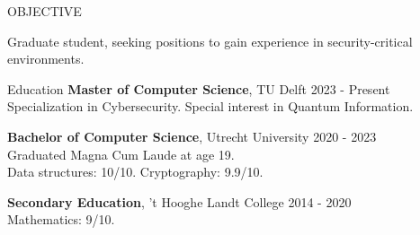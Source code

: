 \documentclass{resume} %
\begin{document}

\begin{rSection}{OBJECTIVE}

{Graduate student, seeking positions to gain experience in security-critical environments.}


\end{rSection}

\begin{rSection}{Education}
{\bf Master of Computer Science}, TU Delft \hfill {2023 - Present}\\
Specialization in Cybersecurity. Special interest in Quantum Information.

{\bf Bachelor of Computer Science}, Utrecht University \hfill {2020 - 2023}\\
Graduated Magna Cum Laude at age 19.\\
Data structures: 10/10. Cryptography: 9.9/10.

{\bf Secondary Education}, 't Hooghe Landt College \hfill {2014 - 2020}\\
Mathematics: 9/10.


\end{rSection}
\end{document}

